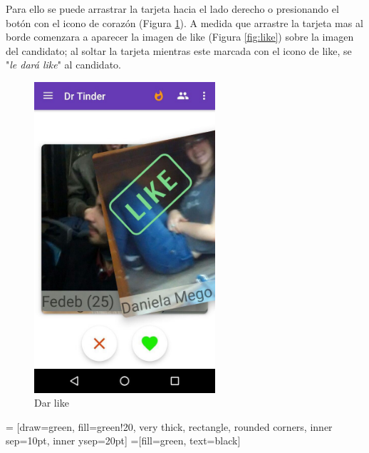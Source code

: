 \documentclass[10pt,letterpaper,extrafontsizes]{memoir}
\begin{document}
Para ello se puede arrastrar la tarjeta hacia el lado derecho o presionando el botón con el icono de corazón (Figura \ref{fig:dlike}). A medida que arrastre la tarjeta mas al borde comenzara a aparecer la imagen de like (Figura \ref{fig:like}) sobre la imagen del candidato; al soltar la tarjeta mientras este marcada con el icono de like, se "\emph{le dará like}" al candidato.

\begin{figure}[H]
    \centering
\includegraphics[width=0.6\textwidth]{graficos/capturas/u}
    \caption{Dar like}
    \label{fig:dlike}
\end{figure}

\begin{center}
 = [draw=green, fill=green!20, very thick,
    rectangle, rounded corners, inner sep=10pt, inner ysep=20pt]
 =[fill=green, text=black]
\end{center}
%
\end{document}
